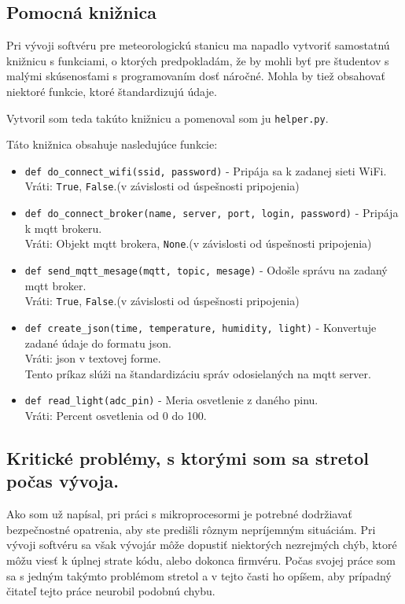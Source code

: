 \subsection{Pomocná knižnica}
Pri vývoji softvéru pre meteorologickú stanicu ma napadlo vytvoriť samostatnú knižnicu s funkciami, o ktorých predpokladám, že by mohli byť pre študentov s malými skúsenosťami s programovaním dosť náročné. Mohla by tiež obsahovať niektoré funkcie, ktoré štandardizujú údaje.

Vytvoril som teda takúto knižnicu a pomenoval som ju \verb|helper.py|.

Táto knižnica obsahuje nasledujúce funkcie:
\begin{itemize}
    \item \verb|def do_connect_wifi(ssid, password)| - Pripája sa k zadanej sieti WiFi. \\Vráti: \verb|True|, \verb|False|.(v závislosti od úspešnosti pripojenia)
    \item \verb|def do_connect_broker(name, server, port, login, password)| - Pripája k \gls{mqtt} brokeru. \\Vráti: Objekt \gls{mqtt} brokera, \verb|None|.(v závislosti od úspešnosti pripojenia)
    \item \verb|def send_mqtt_mesage(mqtt, topic, mesage)| - Odošle správu na zadaný \gls{mqtt} broker. \\Vráti:  \verb|True|, \verb|False|.(v závislosti od úspešnosti pripojenia)
    \item \verb|def create_json(time, temperature, humidity, light)| - Konvertuje zadané údaje do formatu \gls{json}. \\Vráti: \gls{json} v textovej forme. \\Tento príkaz slúži na štandardizáciu správ odosielaných na \gls{mqtt} server.
    \item \verb|def read_light(adc_pin)| - Meria osvetlenie z daného pinu. \\Vráti: Percent osvetlenia od 0 do 100. 
\end{itemize}

\subsection{Kritické problémy, s ktorými som sa stretol počas vývoja.}
Ako som už napísal, pri práci s mikroprocesormi je potrebné dodržiavať bezpečnostné opatrenia, aby ste predišli rôznym nepríjemným situáciám. Pri vývoji softvéru sa však vývojár môže dopustiť niektorých nezrejmých chýb, ktoré môžu viesť k úplnej strate kódu, alebo dokonca firmvéru. Počas svojej práce som sa s jedným takýmto problémom stretol a v tejto časti ho opíšem, aby prípadný čitateľ tejto práce neurobil podobnú chybu.

